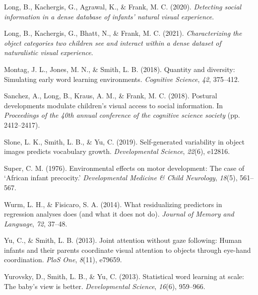 \documentclass[10pt, letterpaper]{article}
\newenvironment{CSLReferences}%
  {}%
  {\par}
\begin{document}
\begin{CSLReferences}{1}{0}
\leavevmode\hypertarget{ref-long2020detecting}{}%
Long, B., Kachergis, G., Agrawal, K., \& Frank, M. C. (2020).
\emph{Detecting social information in a dense database of infants'
natural visual experience}.

\leavevmode\hypertarget{ref-long2021characterizing}{}%
Long, B., Kachergis, G., Bhatt, N., \& Frank, M. C. (2021).
\emph{Characterizing the object categories two children see and interact
within a dense dataset of naturalistic visual experience}.

\leavevmode\hypertarget{ref-montag2018quantity}{}%
Montag, J. L., Jones, M. N., \& Smith, L. B. (2018). Quantity and
diversity: Simulating early word learning environments. \emph{Cognitive
Science}, \emph{42}, 375--412.

\leavevmode\hypertarget{ref-sanchez2018detecting}{}%
Sanchez, A., Long, B., Kraus, A. M., \& Frank, M. C. (2018). Postural
developments modulate children's visual access to social information. In
\emph{Proceedings of the 40th annual conference of the cognitive science
society} (pp. 2412--2417).

\leavevmode\hypertarget{ref-slone2019self}{}%
Slone, L. K., Smith, L. B., \& Yu, C. (2019). Self-generated variability
in object images predicts vocabulary growth. \emph{Developmental
Science}, \emph{22}(6), e12816.

\leavevmode\hypertarget{ref-super1976environmental}{}%
Super, C. M. (1976). Environmental effects on motor development: The
case of {`{A}frican infant precocity.'} \emph{Developmental Medicine \&
Child Neurology}, \emph{18}(5), 561--567.

\leavevmode\hypertarget{ref-wurm2014residualizing}{}%
Wurm, L. H., \& Fisicaro, S. A. (2014). What residualizing predictors in
regression analyses does (and what it does not do). \emph{Journal of
Memory and Language}, \emph{72}, 37--48.

\leavevmode\hypertarget{ref-yu2013joint}{}%
Yu, C., \& Smith, L. B. (2013). Joint attention without gaze following:
Human infants and their parents coordinate visual attention to objects
through eye-hand coordination. \emph{PloS One}, \emph{8}(11), e79659.

\leavevmode\hypertarget{ref-yurovsky2013statistical}{}%
Yurovsky, D., Smith, L. B., \& Yu, C. (2013). Statistical word learning
at scale: The baby's view is better. \emph{Developmental Science},
\emph{16}(6), 959--966.

\end{CSLReferences}


\end{document}
